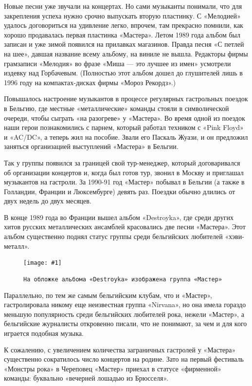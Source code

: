 \documentclass[16pt,a5paper]{book}
\newcommand{\myincludegraphics}[1]{\texttt{[image: \#1]}}
\begin{document}
Новые песни уже звучали на концертах. Но сами музыканты понимали, что для закрепления успеха нужно срочно выпускать
вторую пластинку. С «Мелодией» удалось договориться на удивление легко, впрочем, там прекрасно помнили, как хорошо
продавалась первая пластинка «Мастера». Летом 1989 года альбом был записан и уже зимой появился на прилавках магазинов.
Правда песня «С петлей на шее», давшая название всему альбому, на виниле не вышла. Редакторы фирмы грамзаписи «Мелодия»
во фразе «Миша — это лучшее из имен» усмотрели издевку над Горбачевым. (Полностью этот альбом дошел до глушителей лишь в
1996 году на компактах-дисках фирмы «Мороз Рекордз».)

Повышалось настроение музыкантов в процессе регулярных гастрольных поездок в Бельгию, где местные «металлические»
команды стояли в символической очереди, чтобы сыграть «на разогреве» у «Мастера». Во время одной из поездок наши герои
познакомились с парнем, который работал техником с «Pink Floyd» и «AC/DC», а теперь жил на пособие. Звали его Паскаль
Жуази, и он предложил заняться организацией выступлений «Мастера» в Бельгии.

Так у группы появился за границей свой тур-менеджер, который договаривался об организации концертов и, когда был готов
тур, звонил в Москву и приглашал музыкантов на гастроли. За 1990-91 год «Мастер» побывал в Бельгии (а также в Голландии,
Франции и Люксембурге) девять раз. Поездки обычно длились от двух недель до двух месяцев.

В конце 1989 года во Франции вышел альбом «Destroyka», где среди других хитов русских металлических ансамблей
красовались две песни «Мастера». Этот альбом существенно поднял статус группы среди бельгийских любителей «хэви-металл».

\begin{figure}
    \centering
    \myincludegraphics{Image25}
    \caption{\texttt{На обложке альбома «Destroykа» изображена группа «Мастер»}}
\end{figure}

Параллельно, по тем же самым бельгийским клубам, что и «Мастер», гастролировала никому еще неизвестная группа «Nirvana»,
но она имела гораздо меньшую популярность среди бельгийских любителей рока, нежели «Мастер», а бельгийские журналисты
откровенно писали, что не понимают, за чем и для кого играется подобная музыка.

К сожалению, с увеличением количества заграничных гастролей у «Мастера» существенно сократилось число концертов на
родине. Зато на первый фестиваль «Монстры рока» в Череповец «Мастер» приехал в статусе «фирменной» команды: буквально
«вечерней лошадью из Брюсселя».
\end{document}
